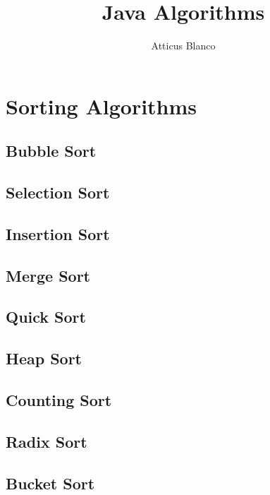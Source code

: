 \documentclass[11pt]{article}
\begin{document}
\title{Java Algorithms}
\author{Atticus Blanco}

\maketitle

    \clearpage

\tableofcontents

    \section{Sorting Algorithms}\label{sec:sorting-algorithms}

    \clearpage

\subsection{Bubble Sort}
            

        \subsection{Selection Sort}
            

        \subsection{Insertion Sort}
        \subsection{Merge Sort}
        \subsection{Quick Sort}
        \subsection{Heap Sort}
        \subsection{Counting Sort}
        \subsection{Radix Sort}
        \subsection{Bucket Sort}
\end{document}
